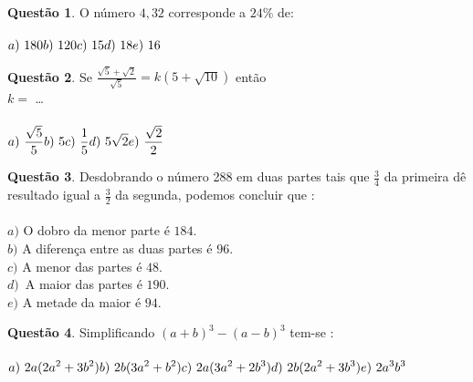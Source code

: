 \documentclass[11pt, twocolumn]{article}
\renewcommand{\=}[1]{\stackrel{#1}{=}} 																					%
\theoremstyle{definition}
\newtheorem{quest}{Quest\~ao}
\begin{document}
\hline
\vfill

\begin{quest}
	O n\'umero $4,32$ corresponde a $24\%$ de: \\ \\
	\(\displaystyle a)\ 180 \hfill b)\ 120 \hfill c)\ 15 \hfill d)\ 18 \hfill e)\ 16\)
\end{quest}

\newpage

\begin{quest}
	Se \(\displaystyle \frac{\sqrt{5} + \sqrt{2}}{\sqrt{5}} = k(5+\sqrt{10}) \) ent\~ao \\ $k =$ \dots \\ \\
	\(\displaystyle a)\ \frac{\sqrt{5}}{5} \hfill b)\ 5 \hfill c)\ \frac{1}{5} \hfill d)\ 5\sqrt{2} \hfill e)\ \frac{\sqrt{2}}{2}\)
\end{quest}

\hline
\vfill

\begin{quest}
	Desdobrando o n\'umero 288 em duas partes tais que \(\displaystyle \frac{3}{4}\) da primeira d\^e resultado igual a \(\displaystyle \frac{3}{2}\) da segunda, podemos concluir que : \\ \\
	$a)$ O dobro da menor parte \'e $184$. \\ $b)$ A diferen\c{c}a entre as duas partes \'e $96$. \\ $c)$ A menor das partes \'e $48$. \\ $d)$\ A maior das partes \'e $190$. \\ $e)$ A metade da maior \'e $94$.
\end{quest}

\hline
\vfill

\begin{quest}
	Simplificando \(\displaystyle (a+b)^3-(a-b)^3\) tem-se : \\ \\
	\(\displaystyle a)\ 2a(2a^2 + 3b^2) \hfill b)\ 2b(3a^2 + b^2) \\ \\ \hfill c)\ 2a(3a^2 + 2b^3) \hfill  d)\ 2b(2a^2 + 3b^3) \hfill \\ \\ e)\ 2a^3b^3 \)
\end{quest}
\end{document}
